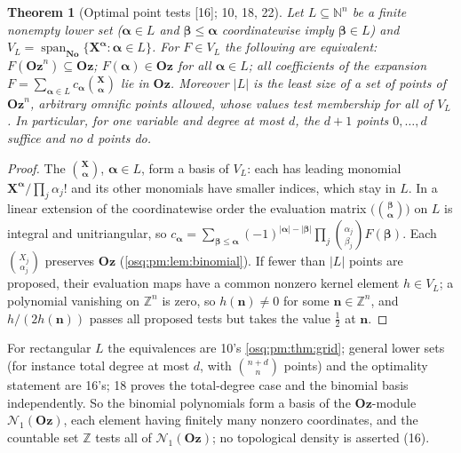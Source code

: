 \documentclass[11pt,letterpaper]{article}
\numberwithin{equation}{section}
\newtheorem{theorem}{Theorem}[section]
\theoremstyle{definition}
\theoremstyle{remark}
\theoremstyle{plain}
\newcommand{\No}{\mathbf{No}}
\newcommand{\Oz}{\mathbf{Oz}}
\newcommand{\Z}{\mathbb Z}
\newcommand{\N}{\mathbb N}
\newcommand{\Span}{\operatorname{span}}
\newcommand{\Num}{\mathscr N}
\newcommand{\src}[1]{\textup{\textsf{[#1]}}}
\begin{document}
\begin{theorem}[Optimal point tests \src{16}; 10, 18, 22]\label{osq:fs:thm:lower}
Let $L\subseteq\N^n$ be a finite nonempty lower set ($\boldsymbol\alpha\in L$ and $\boldsymbol\beta\le\boldsymbol\alpha$ coordinatewise imply
$\boldsymbol\beta\in L$) and $V_L=\Span_{\No}\{\mathbf X^{\boldsymbol\alpha}:\boldsymbol\alpha\in L\}$. For $F\in V_L$ the following are
equivalent: $F(\Oz^n)\subseteq\Oz$; $F(\boldsymbol\alpha)\in\Oz$ for all $\boldsymbol\alpha\in L$; all coefficients of the expansion
$F=\sum_{\boldsymbol\alpha\in L}c_{\boldsymbol\alpha}\binom{\mathbf X}{\boldsymbol\alpha}$ lie in $\Oz$. Moreover $|L|$ is the least size of a set of
points of $\Oz^n$, arbitrary omnific points allowed, whose values test membership for all of $V_L$. In particular, for one variable and degree at
most $d$, the $d+1$ points $0,\dots,d$ suffice and no $d$ points do.
\end{theorem}
\begin{proof}
The $\binom{\mathbf X}{\boldsymbol\alpha}$, $\boldsymbol\alpha\in L$, form a basis of $V_L$: each has leading monomial
$\mathbf X^{\boldsymbol\alpha}/\prod_j\alpha_j!$ and its other monomials have smaller indices, which stay in $L$. In a linear extension of the
coordinatewise order the evaluation matrix $\bigl(\binom{\boldsymbol\beta}{\boldsymbol\alpha}\bigr)$ on $L$ is integral and unitriangular, so
$c_{\boldsymbol\alpha}=\sum_{\boldsymbol\beta\le\boldsymbol\alpha}(-1)^{|\boldsymbol\alpha|-|\boldsymbol\beta|}\prod_j\binom{\alpha_j}{\beta_j}F(\boldsymbol\beta)$.
Each $\binom{X_j}{\alpha_j}$ preserves $\Oz$ (\cref{osq:pm:lem:binomial}). If fewer than $|L|$ points are proposed, their evaluation maps have a
common nonzero kernel element $h\in V_L$; a polynomial vanishing on $\Z^n$ is zero, so $h(\mathbf n)\ne0$ for some $\mathbf n\in\Z^n$, and
$h/(2h(\mathbf n))$ passes all proposed tests but takes the value $\tfrac12$ at $\mathbf n$.
\end{proof}

For rectangular $L$ the equivalences are 10's \cref{osq:pm:thm:grid}; general lower sets (for instance total degree at most $d$, with
$\binom{n+d}n$ points) and the optimality statement are 16's; 18 proves the total-degree case and the binomial basis independently. So the binomial polynomials form a basis of the $\Oz$-module $\Num_1(\Oz)$, each
element having finitely many nonzero coordinates, and the countable set $\Z$ tests all of $\Num_1(\Oz)$; no topological density is asserted
(16).
\end{document}
